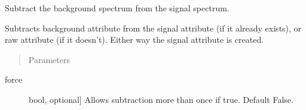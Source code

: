 \documentclass[a4paper,10pt,english]{sphinxmanual}
\begin{document}
\begin{fulllineitems}
\begin{fulllineitems}
\begin{fulllineitems}
\label{\detokenize{sfgtools:sfgtools.SFGProcessTools.SFGDataStore.applied_calibration}}
\end{fulllineitems}


\begin{fulllineitems}
\label{\detokenize{sfgtools:sfgtools.SFGProcessTools.SFGDataStore.background}}
\end{fulllineitems}


\begin{fulllineitems}
\label{\detokenize{sfgtools:sfgtools.SFGProcessTools.SFGDataStore.background_subtract}}
\sphinxAtStartPar
Subtract the background spectrum from the signal spectrum.

\sphinxAtStartPar
Subtracts background attribute from the signal attribute (if it already exists),
or raw attribute (if it doesn’t). Either way the signal attribute is created.
\begin{quote}

\sphinxAtStartPar
Parameters
\end{quote}
\begin{description}
\item[{force}] \leavevmode{[}bool, optional{]}
\sphinxAtStartPar
Allows subtraction more than once if true. Default False.

\end{description}

\end{fulllineitems}


\begin{fulllineitems}
\label{\detokenize{sfgtools:sfgtools.SFGProcessTools.SFGDataStore.background_subtracted}}
\end{fulllineitems}


\end{fulllineitems}
\end{fulllineitems}
\end{document}
